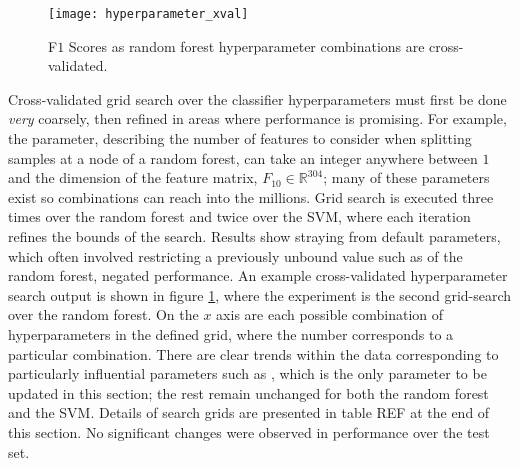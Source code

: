             \begin{figure}[ht]
                \centering
                \texttt{[image: hyperparameter\_xval]}
                \caption{F$1$ Scores as random forest hyperparameter combinations are cross-validated.}
                \label{fig:exp-clf-opt-hyp}
            \end{figure}
            
            Cross-validated grid search over the classifier hyperparameters must first be done \textit{very} coarsely, then refined in areas where performance is promising. For example, the  parameter, describing the number of features to consider when splitting samples at a node of a random forest, can take an integer anywhere between $1$ and the dimension of the feature matrix, $F_{10} \in \mathbb{R}^{304}$; many of these parameters exist so combinations can reach into the millions. Grid search is executed three times over the random forest and twice over the SVM, where each iteration refines the bounds of the search. Results show straying from default parameters, which often involved restricting a previously unbound value such as  of the random forest, negated performance. An example cross-validated hyperparameter search output is shown in figure \ref{fig:exp-clf-opt-hyp}, where the experiment is the second grid-search over the random forest. On the $x$ axis are each possible combination of hyperparameters in the defined grid, where the number corresponds to a particular combination. There are clear trends within the data corresponding to particularly influential parameters such as , which is the only parameter to be updated in this section; the rest remain unchanged for both the random forest and the SVM. Details of search grids are presented in table REF at the end of this section. No significant changes were observed in performance over the test set.
            
            
            
